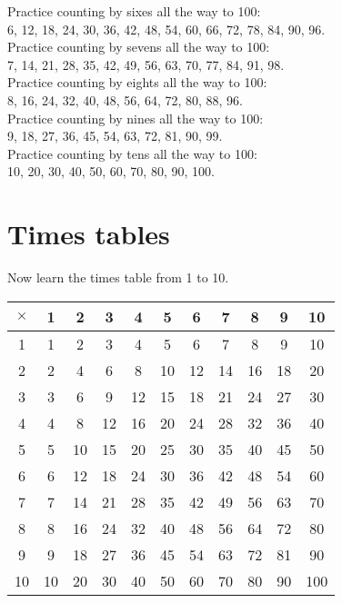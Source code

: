 \documentclass{article}
\begin{document}
\begin{spacing}{1.25}
Practice counting by sixes all the way to 100:\\
6, 12, 18, 24, 30, 36, 42, 48, 54, 60, 66, 72, 78, 84, 90, 96.\\

Practice counting by sevens all the way to 100:\\
7, 14, 21, 28, 35, 42, 49, 56, 63, 70, 77, 84, 91, 98.\\

Practice counting by eights all the way to 100:\\
8, 16, 24, 32, 40, 48, 56, 64, 72, 80, 88, 96.\\

Practice counting by nines all the way to 100:\\
9, 18, 27, 36, 45, 54, 63, 72, 81, 90, 99.\\

Practice counting by tens all the way to 100:\\
10, 20, 30, 40, 50, 60, 70, 80, 90, 100.\\

\newpage

\section{Times tables}
Now learn the times table from 1 to 10.

\begin{center}
\begin{tabular}{|c||*{10}{c|}}
\hline
$\times$ & 1 & 2 & 3 & 4 & 5 & 6 & 7 & 8 & 9 & 10 \\
\hline\hline
1 & 1 & 2 & 3 & 4 & 5 & 6 & 7 & 8 & 9 & 10 \\
2 & 2 & 4 & 6 & 8 & 10 & 12 & 14 & 16 & 18 & 20 \\
3 & 3 & 6 & 9 & 12 & 15 & 18 & 21 & 24 & 27 & 30 \\
4 & 4 & 8 & 12 & 16 & 20 & 24 & 28 & 32 & 36 & 40 \\
5 & 5 & 10 & 15 & 20 & 25 & 30 & 35 & 40 & 45 & 50 \\
6 & 6 & 12 & 18 & 24 & 30 & 36 & 42 & 48 & 54 & 60 \\
7 & 7 & 14 & 21 & 28 & 35 & 42 & 49 & 56 & 63 & 70 \\
8 & 8 & 16 & 24 & 32 & 40 & 48 & 56 & 64 & 72 & 80 \\
9 & 9 & 18 & 27 & 36 & 45 & 54 & 63 & 72 & 81 & 90 \\
10 & 10 & 20 & 30 & 40 & 50 & 60 & 70 & 80 & 90 & 100 \\
\hline
\end{tabular}
\end{center}


\end{spacing}
\end{document}
